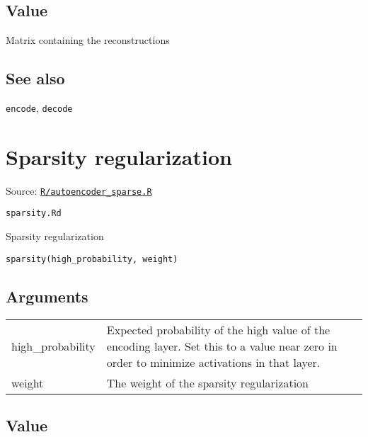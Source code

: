 \hypertarget{value}{\subsection{\texorpdfstring{\protect\hyperlink{value}{}Value}{Value}}\label{value}}

Matrix containing the reconstructions

\hypertarget{see-also}{\subsection{\texorpdfstring{\protect\hyperlink{see-also}{}See
also}{See also}}\label{see-also}}

\texttt{encode}, \texttt{decode}

\section{Sparsity regularization}\label{sparsity-regularization}

Source:
\href{https://github.com/fdavidcl/ruta/blob/master/R/autoencoder_sparse.R}{\texttt{R/autoencoder\_sparse.R}}

\texttt{sparsity.Rd}

Sparsity regularization

\begin{verbatim}
sparsity(high_probability, weight)
\end{verbatim}

\hypertarget{arguments}{\subsection{\texorpdfstring{\protect\hyperlink{arguments}{}Arguments}{Arguments}}\label{arguments}}

\begin{longtable}[c]{@{}>{\small}p{3cm}>{\raggedright}p{12.5cm}@{}}
\toprule
high\_probability & Expected probability of the high value of the
encoding layer. Set this to a value near zero in order to minimize
activations in that layer.\tabularnewline
weight & The weight of the sparsity regularization\tabularnewline
\bottomrule
\end{longtable}

\hypertarget{value}{\subsection{\texorpdfstring{\protect\hyperlink{value}{}Value}{Value}}\label{value}}

